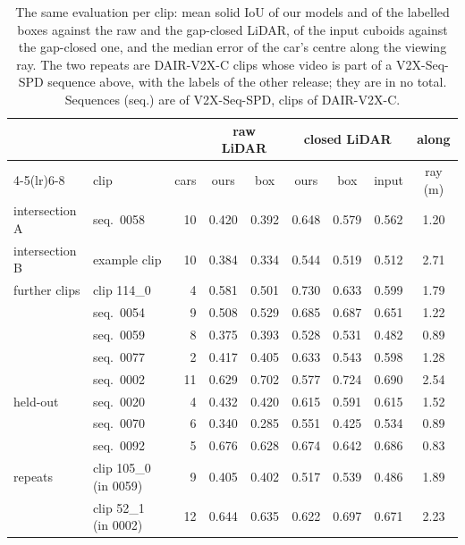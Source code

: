 \begin{table}[t]
\centering
\caption{The same evaluation per clip: mean solid IoU of our models and of the labelled boxes against the raw and the gap-closed LiDAR, of the input cuboids against the gap-closed one, and the median error of the car's centre along the viewing ray. The two repeats are DAIR-V2X-C clips whose video is part of a V2X-Seq-SPD sequence above, with the labels of the other release; they are in no total. Sequences (seq.) are of V2X-Seq-SPD, clips of DAIR-V2X-C.}
\label{tab:clips}
\footnotesize
\begin{tabular}{llrcccccc}
\toprule
 & & & \multicolumn{2}{c}{raw LiDAR} & \multicolumn{3}{c}{closed LiDAR} & along \\
\cmidrule(lr){4-5}\cmidrule(lr){6-8}
 & clip & cars & ours & box & ours & box & input & ray (m) \\
\midrule
intersection A & seq.\ 0058 & 10 & 0.420 & 0.392 & 0.648 & 0.579 & 0.562 & 1.20 \\
intersection B & example clip & 10 & 0.384 & 0.334 & 0.544 & 0.519 & 0.512 & 2.71 \\
further clips & clip 114\_0 & 4 & 0.581 & 0.501 & 0.730 & 0.633 & 0.599 & 1.79 \\
 & seq.\ 0054 & 9 & 0.508 & 0.529 & 0.685 & 0.687 & 0.651 & 1.22 \\
 & seq.\ 0059 & 8 & 0.375 & 0.393 & 0.528 & 0.531 & 0.482 & 0.89 \\
 & seq.\ 0077 & 2 & 0.417 & 0.405 & 0.633 & 0.543 & 0.598 & 1.28 \\
 & seq.\ 0002 & 11 & 0.629 & 0.702 & 0.577 & 0.724 & 0.690 & 2.54 \\
\midrule
held-out & seq.\ 0020 & 4 & 0.432 & 0.420 & 0.615 & 0.591 & 0.615 & 1.52 \\
 & seq.\ 0070 & 6 & 0.340 & 0.285 & 0.551 & 0.425 & 0.534 & 0.89 \\
 & seq.\ 0092 & 5 & 0.676 & 0.628 & 0.674 & 0.642 & 0.686 & 0.83 \\
\midrule
repeats & clip 105\_0 (in 0059) & 9 & 0.405 & 0.402 & 0.517 & 0.539 & 0.486 & 1.89 \\
 & clip 52\_1 (in 0002) & 12 & 0.644 & 0.635 & 0.622 & 0.697 & 0.671 & 2.23 \\
\bottomrule
\end{tabular}
\end{table}
